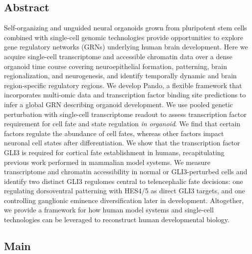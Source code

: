 \subsection{Abstract}
Self-organizing and unguided neural organoids grown from pluripotent stem cells combined with single-cell genomic technologies provide opportunities to explore gene regulatory networks (GRNs) underlying human brain development. Here we acquire single-cell transcriptome and accessible chromatin data over a dense organoid time course covering neuroepithelial formation, patterning, brain regionalization, and neurogenesis, and identify temporally dynamic and brain region-specific regulatory regions. We develop Pando, a flexible framework that incorporates multi-omic data and transcription factor binding site predictions to infer a global GRN describing organoid development. We use pooled genetic perturbation with single-cell transcriptome readout to assess transcription factor requirement for cell fate and state regulation \textit{in organoid}. We find that certain factors regulate the abundance of cell fates, whereas other factors impact neuronal cell states after differentiation. We show that the transcription factor GLI3 is required for cortical fate establishment in humans, recapitulating previous work performed in mammalian model systems. We measure transcriptome and chromatin accessibility in normal or GLI3-perturbed cells and identify two distinct GLI3 regulomes central to telencephalic fate decisions: one regulating dorsoventral patterning with HES4/5 as direct GLI3 targets, and one controlling ganglionic eminence diversification later in development. Altogether, we provide a framework for how human model systems and single-cell technologies can be leveraged to reconstruct human developmental biology.


\subsection{Main}

